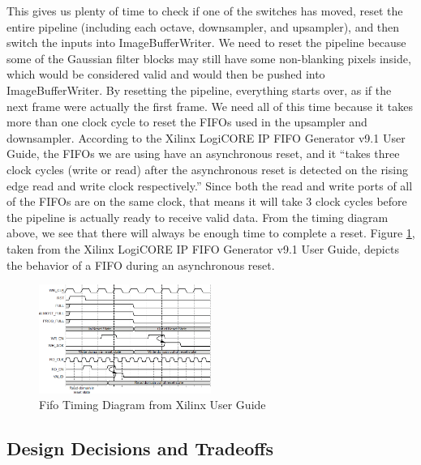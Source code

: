 This gives us plenty of time to check if one of the switches has moved, reset 
the entire pipeline (including each octave, downsampler, and upsampler), and 
then switch the inputs into ImageBufferWriter. We need to reset the pipeline 
because some of the Gaussian filter blocks may still have some non-blanking 
pixels inside, which would be considered valid and would then be pushed into 
ImageBufferWriter. By resetting the pipeline, everything starts over, as if the 
next frame were actually the first frame. We need all of this time because it 
takes more than one clock cycle to reset the FIFOs used in the upsampler and 
downsampler. According to the Xilinx LogiCORE IP FIFO Generator v9.1 User Guide, 
the FIFOs we are using have an asynchronous reset, and it ``takes three clock 
cycles (write or read) after the asynchronous reset is detected on the rising 
edge read and write clock respectively.'' Since both the read and write ports 
of all of the FIFOs are on the same clock, that means it will take 3 clock 
cycles before the pipeline is actually ready to receive valid data. From the 
timing diagram above, we see that there will always be enough time to complete 
a reset. Figure \ref{fig:fifo_timing}, taken from the Xilinx LogiCORE IP FIFO Generator 
v9.1 User Guide, depicts the behavior of a FIFO during an asynchronous reset.

\begin{figure}
    \includegraphics[width=0.5\textwidth]{processed_image_pngs/fifo_timing.png}
    \caption{Fifo Timing Diagram from Xilinx User Guide}
    \label{fig:fifo_timing}
\end{figure}




\subsection{Design Decisions and Tradeoffs}

